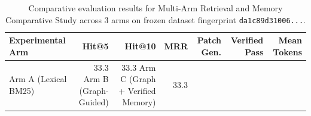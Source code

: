 \begin{table}[t]
\centering
\small
\begin{tabular}{lrrrrrr}
\toprule
\textbf{Experimental Arm} & \textbf{Hit@5} & \textbf{Hit@10} & \textbf{MRR} & \textbf{Patch Gen.} & \textbf{Verified Pass} & \textbf{Mean Tokens} \\
\midrule
Arm A (Lexical BM25) & 33.3%
Arm B (Graph-Guided) & 33.3%
Arm C (Graph + Verified Memory) & 33.3%
\bottomrule
\end{tabular}
\caption{Comparative evaluation results for Multi-Arm Retrieval and Memory Comparative Study across 3 arms on frozen dataset fingerprint \texttt{da1c89d31006...}.}
\label{tab:tracefix_multi-arm_retrieval_and_memory_comparative_study}
\end{table}